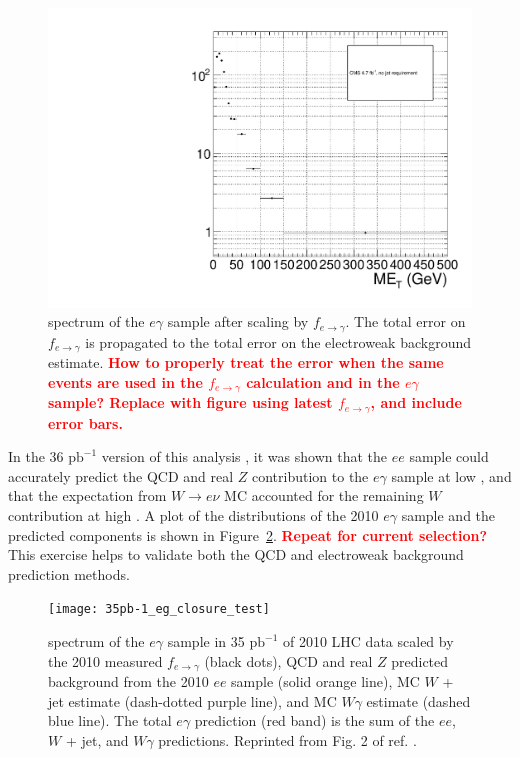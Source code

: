 \documentclass[dissertation.tex]{subfiles}
\begin{document}
\begin{figure}
	\centering
	\includegraphics[scale=0.4]{eg_MET}
	\caption{\MET spectrum of the $e\gamma$ sample after scaling by $f_{e\rightarrow\gamma}$.  The total error on $f_{e\rightarrow\gamma}$ is propagated to the total error on the electroweak background estimate.  \textcolor{red}{\textbf{How to properly treat the error when the same events are used in the $f_{e\rightarrow\gamma}$ calculation and in the $e\gamma$ sample?  Replace with figure using latest $f_{e\rightarrow\gamma}$, and include error bars.}}}
	\label{fig:eg_MET}
\end{figure}

In the 36 $\mbox{pb}^{-1}$ version of this analysis \cite{CMS_GMSB_35pb-1}, it was shown that the $ee$ sample could accurately predict the QCD and real $Z$ contribution to the $e\gamma$ sample at low \MET, and that the expectation from $W\rightarrow e\nu$ MC accounted for the remaining $W$ contribution at high \MET.  A plot of the \MET distributions of the 2010 $e\gamma$ sample and the predicted components is shown in Figure~\ref{fig:35pb-1_eg_closure_test}.  \textcolor{red}{\textbf{Repeat for current selection?}}  This exercise helps to validate both the QCD and electroweak background prediction methods.

\begin{figure}
	\centering
	\texttt{[image: 35pb-1\_eg\_closure\_test]}
	\caption{\MET spectrum of the $e\gamma$ sample in 35 $\mbox{pb}^{-1}$ of 2010 LHC data scaled by the 2010 measured $f_{e\rightarrow\gamma}$ (black dots), QCD and real $Z$ predicted background from the 2010 $ee$ sample (solid orange line), MC $W$ + jet estimate (dash-dotted purple line), and MC $W\gamma$ estimate (dashed blue line).  The total $e\gamma$ prediction (red band) is the sum of the $ee$, $W$ + jet, and $W\gamma$ predictions.  Reprinted from Fig. 2 of ref. \cite{CMS_GMSB_35pb-1}.}
	\label{fig:35pb-1_eg_closure_test}
\end{figure}
\end{document}
